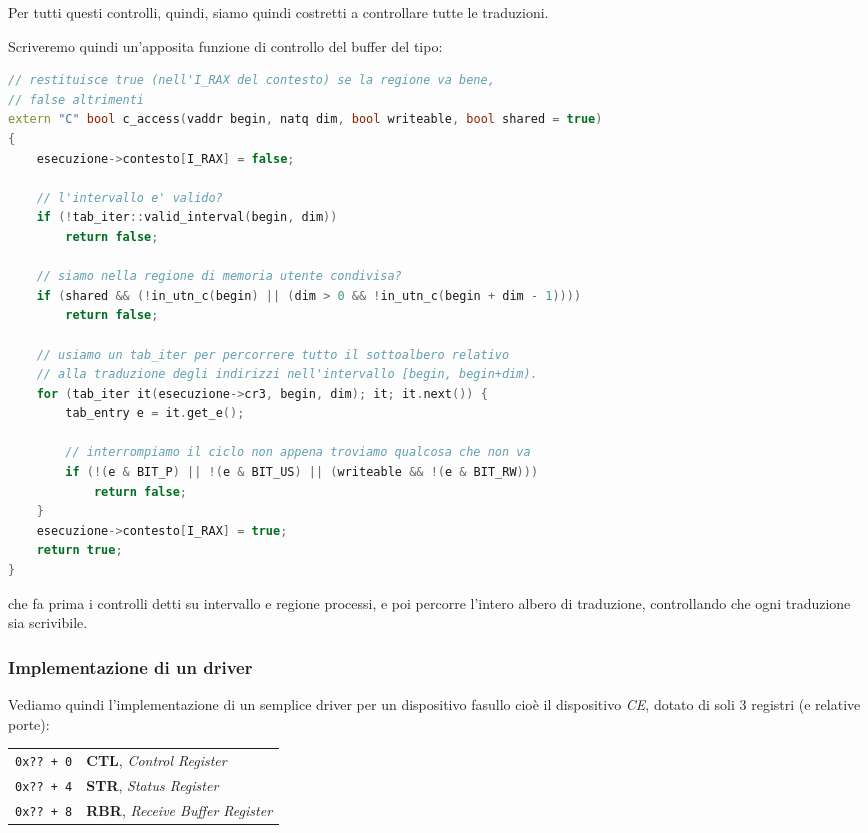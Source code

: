 \documentclass[a4paper,11pt]{article}
\begin{document}
Per tutti questi controlli, quindi, siamo quindi costretti a controllare tutte le traduzioni.

Scriveremo quindi un'apposita funzione di controllo del buffer del tipo:
\begin{lstlisting}[language=C++, style=codestyle]	
// restituisce true (nell'I_RAX del contesto) se la regione va bene,
// false altrimenti
extern "C" bool c_access(vaddr begin, natq dim, bool writeable, bool shared = true)
{
	esecuzione->contesto[I_RAX] = false;

	// l'intervallo e' valido?
	if (!tab_iter::valid_interval(begin, dim))
		return false;

	// siamo nella regione di memoria utente condivisa?
	if (shared && (!in_utn_c(begin) || (dim > 0 && !in_utn_c(begin + dim - 1))))
		return false;

	// usiamo un tab_iter per percorrere tutto il sottoalbero relativo
	// alla traduzione degli indirizzi nell'intervallo [begin, begin+dim).
	for (tab_iter it(esecuzione->cr3, begin, dim); it; it.next()) {
		tab_entry e = it.get_e();

		// interrompiamo il ciclo non appena troviamo qualcosa che non va
		if (!(e & BIT_P) || !(e & BIT_US) || (writeable && !(e & BIT_RW)))
			return false;
	}
	esecuzione->contesto[I_RAX] = true;
	return true;
}
\end{lstlisting}
che fa prima i controlli detti su intervallo e regione processi, e poi percorre l'intero albero di traduzione, controllando che ogni traduzione sia scrivibile.

\subsubsection{Implementazione di un driver}
Vediamo quindi l'implementazione di un semplice driver per un dispositivo fasullo cioè il dispositivo \textit{CE}, dotato di soli 3 registri (e relative porte):
\begin{table}[h!]
	\center
	\begin{tabular} { p{1.5cm} | p{7cm} }
		\lstinline|0x?? + 0| & \textbf{CTL}, \textit{Control Register} \\
		\lstinline|0x?? + 4| & \textbf{STR}, \textit{Status Register} \\
		\lstinline|0x?? + 8| & \textbf{RBR}, \textit{Receive Buffer Register} \\
	\end{tabular}
\end{table}
\end{document}
